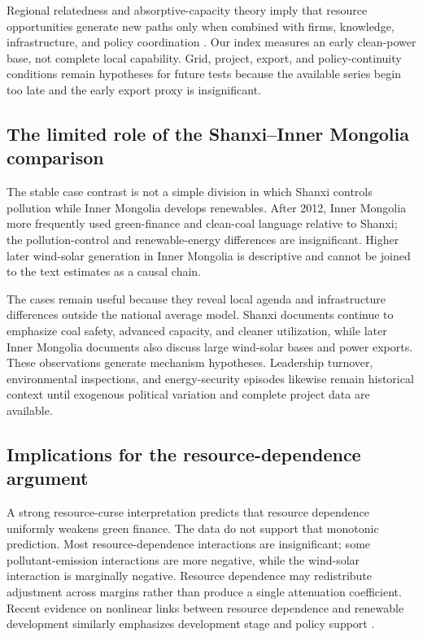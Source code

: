 \documentclass[11pt]{article}
\begin{document}
Regional relatedness and absorptive-capacity theory imply that resource opportunities generate new paths only when combined with firms, knowledge, infrastructure, and policy coordination \parencite{cohenlevinthal1990,boschma2017,santoalhaboschma2021,zhaoetal2026}. Our index measures an early clean-power base, not complete local capability. Grid, project, export, and policy-continuity conditions remain hypotheses for future tests because the available series begin too late and the early export proxy is insignificant.

\subsection{The limited role of the Shanxi--Inner Mongolia comparison}

The stable case contrast is not a simple division in which Shanxi controls pollution while Inner Mongolia develops renewables. After 2012, Inner Mongolia more frequently used green-finance and clean-coal language relative to Shanxi; the pollution-control and renewable-energy differences are insignificant. Higher later wind-solar generation in Inner Mongolia is descriptive and cannot be joined to the text estimates as a causal chain.

The cases remain useful because they reveal local agenda and infrastructure differences outside the national average model. Shanxi documents continue to emphasize coal safety, advanced capacity, and cleaner utilization, while later Inner Mongolia documents also discuss large wind-solar bases and power exports. These observations generate mechanism hypotheses. Leadership turnover, environmental inspections, and energy-security episodes likewise remain historical context until exogenous political variation and complete project data are available.

\subsection{Implications for the resource-dependence argument}

A strong resource-curse interpretation predicts that resource dependence uniformly weakens green finance. The data do not support that monotonic prediction. Most resource-dependence interactions are insignificant; some pollutant-emission interactions are more negative, while the wind-solar interaction is marginally negative. Resource dependence may redistribute adjustment across margins rather than produce a single attenuation coefficient. Recent evidence on nonlinear links between resource dependence and renewable development similarly emphasizes development stage and policy support \parencite{zhangetal2024resource}.
\end{document}
